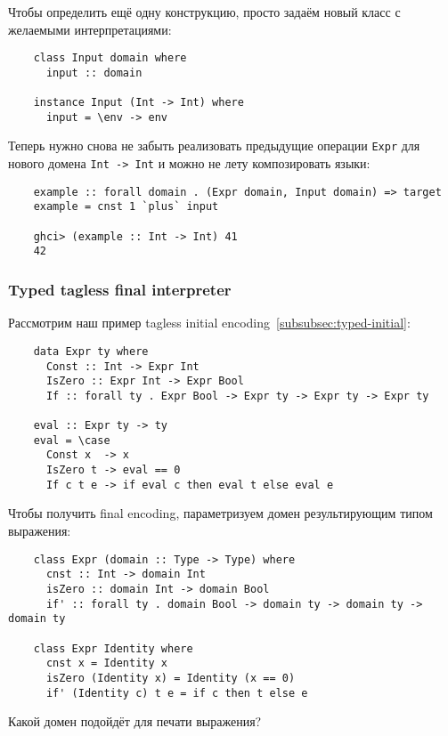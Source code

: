 Чтобы определить ещё одну конструкцию, просто задаём новый класс с желаемыми интерпретациями:
\begin{verbatim}
    class Input domain where
      input :: domain

    instance Input (Int -> Int) where
      input = \env -> env
\end{verbatim}

Теперь нужно снова не забыть реализовать предыдущие операции \texttt{Expr} для нового домена \texttt{Int -> Int} и можно не лету композировать языки:
\begin{verbatim}
    example :: forall domain . (Expr domain, Input domain) => target
    example = cnst 1 `plus` input

    ghci> (example :: Int -> Int) 41
    42
\end{verbatim}

\subsubsection{Typed tagless final interpreter}

Рассмотрим наш пример tagless initial encoding~\ref{subsubsec:typed-initial}:
\begin{verbatim}
    data Expr ty where
      Const :: Int -> Expr Int
      IsZero :: Expr Int -> Expr Bool
      If :: forall ty . Expr Bool -> Expr ty -> Expr ty -> Expr ty

    eval :: Expr ty -> ty
    eval = \case
      Const x  -> x
      IsZero t -> eval == 0
      If c t e -> if eval c then eval t else eval e
\end{verbatim}
Чтобы получить final encoding, параметризуем домен результирующим типом выражения:
\begin{verbatim}
    class Expr (domain :: Type -> Type) where
      cnst :: Int -> domain Int
      isZero :: domain Int -> domain Bool
      if' :: forall ty . domain Bool -> domain ty -> domain ty -> domain ty

    class Expr Identity where
      cnst x = Identity x
      isZero (Identity x) = Identity (x == 0)
      if' (Identity c) t e = if c then t else e
\end{verbatim}

\begin{task}
    Какой домен подойдёт для печати выражения?
\end{task}

